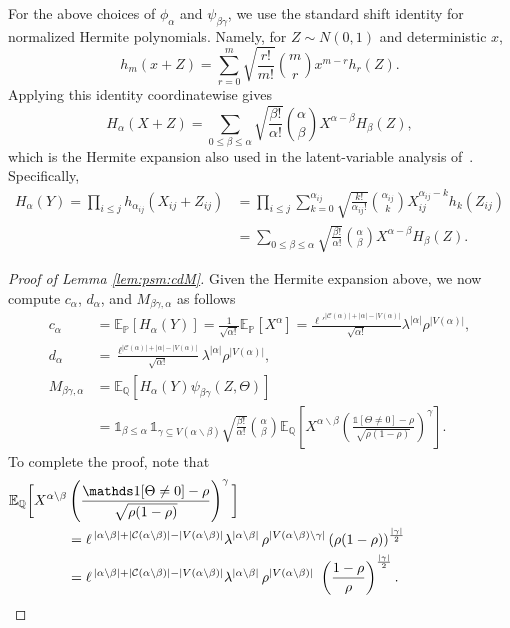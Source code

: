 \documentclass[11pt, letterpaper]{article}
\numberwithin{equation}{section}
\newcommand{\E}{\mathbb{E}}
\newcommand{\PP}{\mathbb{P}}
\newcommand{\QQ}{\mathbb{Q}}
\begin{document}
For the above choices of $\phi_\alpha$ and $\psi_{\beta\gamma}$, we use the
standard shift identity for normalized Hermite polynomials. Namely, for
$Z\sim N(0,1)$ and deterministic $x$,
\[
h_m(x+Z)=\sum_{r=0}^m \sqrt{\frac{r!}{m!}}\binom{m}{r}x^{m-r}h_r(Z).
\]
Applying this identity coordinatewise gives
\[
H_\alpha(X+Z)
=
\sum_{0\le \beta\le \alpha}
\sqrt{\frac{\beta!}{\alpha!}}\binom{\alpha}{\beta}
X^{\alpha-\beta}H_\beta(Z),
\]
which is the Hermite expansion also used in the latent-variable analysis of~\cite{sohn2025sharp}. Specifically,
\begin{align*}
    H_\alpha(Y)=\prod_{i\leq j}h_{\alpha_{ij}}(X_{ij}+Z_{ij})&=\prod_{i \leq j}\sum_{k=0}^{\alpha_{ij}}\sqrt{\frac{k!}{\alpha_{ij}!}}{ \binom{\alpha_{ij}}{k}}X_{ij}^{\alpha_{ij}-k}h_k(Z_{ij})\\
    &=\sum_{0 \leq \beta \leq \alpha}\sqrt{\frac{\beta!}{\alpha!}}{\binom{\alpha}{\beta}}X^{\alpha - \beta}H_\beta(Z).
\end{align*}
\begin{proof}[Proof of Lemma \ref{lem:psm:cdM}]
Given the Hermite expansion above, we now compute $c_\alpha$, $d_\alpha$, and $M_{\beta\gamma,\alpha}$ as follows
\begin{align*}
    \nonumber c_\alpha&=\E_\PP[H_\alpha(Y)]=\frac{1}{\sqrt{\alpha!}}\E_\PP\left[X^{\alpha}\right]=\frac{\ell'^{|\mathcal{C}(\alpha)|+|\alpha|-|V(\alpha)|}}{\sqrt{\alpha!}}\lambda^{|\alpha|}\rho^{|V(\alpha)|},  \\   
    d_{\alpha}&=\frac{\ell^{|\mathcal{C}(\alpha)|+|\alpha|-|V(\alpha)|}}{\sqrt{\alpha!}}\lambda^{|\alpha|}\rho^{|V(\alpha)|},\\
M_{\beta\gamma,\alpha}&=\E_\QQ\left[H_\alpha(Y)\psi_{\beta\gamma}(Z,\Theta)\right]\\
\nonumber &=\mathds 1_{\beta\le\alpha}\,\mathds 1_{\gamma\subseteq V(\alpha \backslash \beta)} 
\sqrt{\frac{\beta!}{\alpha!}}
\binom{\alpha}{\beta} \E_\QQ\left[X^{\alpha \backslash \beta}\left(\frac{\mathds 1 [\Theta\neq 0]-\rho}{\sqrt{\rho(1-\rho)}}\right)^\gamma\right].
\end{align*}
To complete the proof, note that
\begin{align*}
\E_\QQ\bigg[X^{\alpha \backslash \beta} & \left(\frac{\mathds 1 [\Theta\neq 0]-\rho}{\sqrt{\rho(1-\rho)}}\right)^\gamma\bigg]\\
 & =
 \ell^{\,|\alpha \backslash \beta|+|\mathcal{C}(\alpha \backslash \beta)|-|V(\alpha \backslash \beta)|}\lambda^{|\alpha \backslash \beta|}\,
\rho^{|V(\alpha \backslash \beta)\backslash\gamma|}\, (\rho(1-\rho))^{\frac{|\gamma|}{2}}
\\
&=
\ell^{\,|\alpha \backslash \beta|+|\mathcal{C}(\alpha \backslash \beta)|-|V(\alpha \backslash \beta)|} \lambda^{|\alpha \backslash \beta|}\,
\rho^{|V(\alpha \backslash \beta)|}\,
\,
 \left(\frac{1 - \rho}{\rho}\right)^{\frac{|\gamma|}{2}}. \qquad \qquad \qquad \qquad \qedhere
\end{align*} 
\end{proof}
\end{document}
